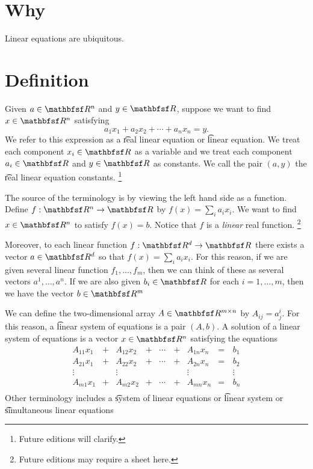 
\section*{Why}

Linear equations are ubiquitous.

\section*{Definition}

Given $a \in \R ^n$ and $y \in \R $, suppose we want to find $x \in \R ^n$ satisfying
  \[
a_1x_1 + a_2x_2 + \cdots + a_nx_n = y.
  \]
We refer to this expression as a \t{real linear equation} or \t{linear equation}.
We treat each component $x_i \in \R $ as a variable and we treat each component $a_i \in \R $ and $y \in \R $ as constants.
We call the pair $(a, y)$ the \t{real linear equation constants}.
  \ifhmode\unskip\fi\footnote{
Future editions will clarify.
  }

The source of the terminology  is by viewing the left hand side as a function.
Define $f: \R ^n \to \R $ by $f(x) = \sum_{i}a_ix_i$.
We want to find $x \in \R ^n$ to satisfy $f(x) = b$.
Notice that $f$ is a \textit{linear} real function.
  \ifhmode\unskip\fi\footnote{
Future editions may require a sheet here.
  }

Moreover, to each linear function $f: \R ^d \to \R $ there exists a vector $a \in \R ^d$ so that $f(x) = \sum_{i} a_ix_i$.
For this reason, if we are given several linear function $f_1, \dots , f_m$, then we can think of these as several vectors $a^1, \dots , a^n$.
If we are also given $b_i \in \R $ for each $i = 1, \dots , m$, then we have the vector $b \in \R ^m$

We can define the two-dimensional array $A \in \R ^{m \times n}$ by $A_{ij} = a^{i}_j$.
For this reason, a \t{linear system of equations} is a pair $(A, b)$.
A solution of a linear system of equations is a vector $x \in \R ^n$ satisfying the equations
  \[
\begin{aligned}
A_{11}x_1 & + & A_{12}x_2 & + & \cdots \, & + & A_{1n}x_n & = \, & b_1 \\
A_{21}x_1 & + & A_{22}x_2 & + & \cdots & + & A_{2n}x_n & = & b_2 \\
\vdots & & \vdots & & & & \vdots & & \vdots \\
A_{m1}x_1 & + & A_{m2}x_2 & + & \cdots & + & A_{mn}x_n & = & b_n \\
\end{aligned}
  \]
Other terminology includes a \t{system of linear equations} or \t{linear system} or \t{simultaneous linear equations}
